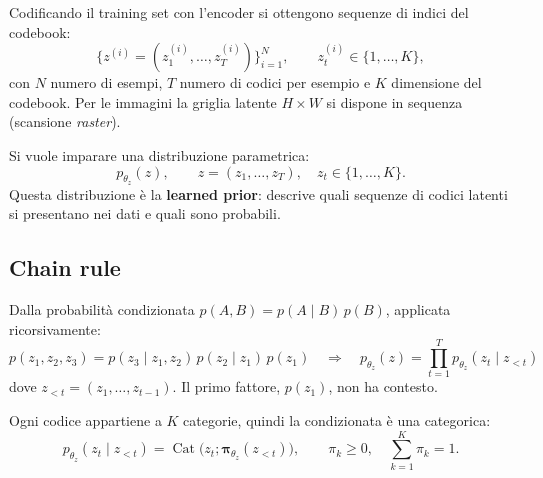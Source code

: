 \documentclass[11pt,a4paper]{article}
\begin{document}
Codificando il training set con l'encoder si ottengono sequenze di 
indici del codebook:
\[
\{z^{(i)}=(z^{(i)}_1,\dots,z^{(i)}_T)\}_{i=1}^{N}, \qquad z^{(i)}_t\in\{1,\dots,K\},
\]
con $N$ numero di esempi, $T$ numero di codici per esempio e $K$ dimensione 
del codebook.
Per le immagini la griglia latente $H\times W$ si dispone in sequenza 
(scansione \emph{raster}).

Si vuole imparare una distribuzione parametrica:
\[
p_{\theta_z}(z),\qquad z=(z_1,\ldots,z_T),\quad z_t\in\{1,\ldots,K\}.
\]
Questa distribuzione è la \textbf{learned prior}: descrive quali sequenze di codici
latenti si presentano nei dati e quali sono probabili.

\subsection{Chain rule}
Dalla probabilità condizionata $p(A,B)=p(A\mid B)\,p(B)$, applicata ricorsivamente:
\[
p(z_1,z_2,z_3)=p(z_3\mid z_1,z_2)\,p(z_2\mid z_1)\,p(z_1)
\quad\Longrightarrow\quad
\boxed{p_{\theta_z}(z)=\prod_{t=1}^{T}p_{\theta_z}(z_t\mid z_{<t})}
\]
dove $z_{<t}=(z_1,\dots,z_{t-1})$. Il primo fattore, $p(z_1)$, non ha contesto.

Ogni codice appartiene a $K$ categorie, quindi la condizionata è una categorica:
\[
p_{\theta_z}(z_t\mid z_{<t})=\operatorname{Cat}\big(z_t;\boldsymbol{\pi}_{\theta_z}(z_{<t})\big),
\qquad \pi_k\ge 0,\quad \sum_{k=1}^{K}\pi_k=1 .
\]
\end{document}
